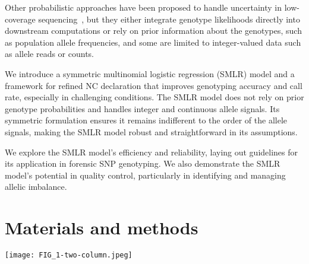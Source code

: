 \documentclass[preprint,5p,times,11pt]{elsarticle}
\begin{document}
Other probabilistic approaches have been proposed to handle uncertainty in low-coverage sequencing~\cite{mostad}, but they either integrate genotype likelihoods directly into downstream computations or rely on prior information about the genotypes, such as population allele frequencies, and some are limited to integer-valued data such as allele reads or counts.

We introduce a symmetric multinomial logistic regression (SMLR) model and a framework for refined NC declaration that improves genotyping accuracy and call rate, especially in challenging conditions.
The SMLR model does not rely on prior genotype probabilities and handles integer and continuous allele signals.
Its symmetric formulation ensures it remains indifferent to the order of the allele signals, making the SMLR model robust and straightforward in its assumptions.

We explore the SMLR model's efficiency and reliability, laying out guidelines for its application in forensic SNP genotyping.
We also demonstrate the SMLR model's potential in quality control, particularly in identifying and managing allelic imbalance.



\section{Materials and methods}
\begin{figure*}
\centering
\texttt{[image: FIG\_1-two-column.jpeg]}
\caption{
Genotype predictions for the examinations of \SI{31.25}{\pg} DNA.\\
Each plot displays 1,931~SNP observations classified using the genotyping methods:
HID SNP Genotyper Plugin~(HSG), enforcing the quality checks~(EQC), and symmetric multinomial logistic regression~(SMLR).
A dot represents a pair of SNP read counts $\left(s_1, s_2\right)$.
The true genotypes are coloured red for heterozygotes and blue or yellow for homozygotes.
Failed genotype predictions are indicated by red crosses for wrong calls and black pluses for no-calls.
In the EQC plot~(middle), the grey areas show where the HSG is guaranteed to flag for allelic imbalance.
In the SMLR plot (right), the solid lines show the decision boundaries of the SMLR model with an intercept fitted to square-root transformed allele signals. The grey area marks the no-call zone where genotype probabilities fall short of the threshold $q = 0.9937$ (a value chosen for illustrative purposes).
Outside the grey area, the predicted genotype has $P\left(G \mid s_1, s_2\right) \geq q$.
}
\label{fig:methods}
\end{figure*}
\end{document}
